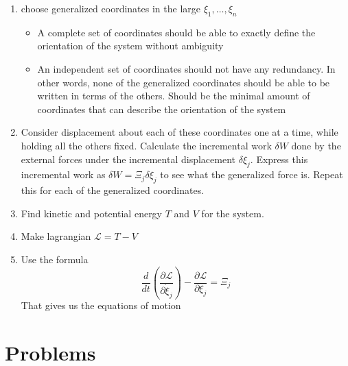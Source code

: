 \begin{enumerate}
  \item{choose generalized coordinates in the large $\xi_{1},\dots,\xi_{n}$}
  \begin{itemize}
    \item{A complete set of coordinates should be able to exactly define the orientation of the system without ambiguity}
    \item{%
      An independent set of coordinates should not have any redundancy.
      In other words, none of the generalized coordinates should be able to be written in terms of the others.
      Should be the minimal amount of coordinates that can describe the orientation of the system
    }
  \end{itemize}
  \item{%
    Consider displacement about each of these coordinates one at a time, while holding all the others fixed.
    Calculate the incremental work $\delta W$ done by the external forces under the incremental displacement $\delta\xi_{j}$.
    Express this incremental work as $\delta W=\Xi_{j}\delta\xi_{j}$ to see what the generalized force is.
    Repeat this for each of the generalized coordinates.
  }
  \item{Find kinetic and potential energy $T$ and $V$ for the system.}
  \item{Make lagrangian $\mathscr{L}=T-V$}
  \item{Use the formula}
  \begin{equation*}
    \frac{d}{dt}\left(\frac{\partial\mathscr{L}}{\partial\dot{\xi}_{j}}\right)-\frac{\partial\mathscr{L}}{\partial\xi_{j}}=\Xi_{j}
  \end{equation*}
  That gives us the equations of motion
\end{enumerate}

\chapter{Problems}

